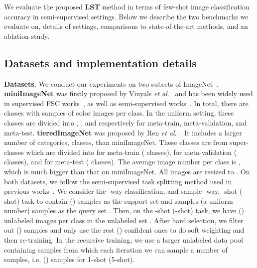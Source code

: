 \documentclass{article}
\newcommand{\myparagraph}[1]{\vspace{0.1em}\noindent\textbf{#1}}
\begin{document}
\label{expriments}


We evaluate the proposed \textbf{LST} method in terms of few-shot image classification accuracy in semi-supervised settings.
Below we describe the two benchmarks we evaluate on, details of settings, comparisons to state-of-the-art methods, and an ablation study.


\subsection{Datasets and implementation details}
\label{sec_dataset_settings}

\myparagraph{Datasets.} We conduct our experiments on two subsets of ImageNet~\cite{Russakovsky2015}.
\textbf{miniImageNet} was firstly proposed by Vinyals \emph{et al}.~\cite{VinyalsBLKW16} and has been widely used in supervised FSC works~\cite{FinnAL17, RaviICLR2017, SunCVPR2019, RusuICLR2019, GrantICLR2018, FranceschiICML18}, as well as semi-supervised works~\cite{LiuICLR2019transductive, RenICLR2018_semisupervised}. 
In total, there are  classes with  samples of  color images per class. 
In the uniform setting, these classes are divided into , , and  respectively for meta-train, meta-validation, and meta-test.
\textbf{tieredImageNet} was proposed by Ren \emph{et al}.~\cite{RenICLR2018_semisupervised}. 
It includes a larger number of categories,   classes, than miniImageNet.
These classes are from  super-classes which are divided into  for meta-train ( classes),  for meta-validation ( classes), 
and  for meta-test ( classes).
The average image number per class is , which is much bigger than that on miniImageNet. 
All images are resized to . On both datasets, we follow the semi-supervised task splitting method used in previous works~\cite{RenICLR2018_semisupervised, LiuICLR2019transductive}.
We consider the -way classification, and sample -way, -shot (-shot) task to contain  () samples as the support set  and  samples (a uniform number) samples as the query set . 
Then, on the -shot (-shot) task, we have  () unlabeled images per class in the unlabeled set .
After hard selection, we filter out  () samples and only use the rest  () confident ones to do soft weighting and then re-training.
In the recursive training, we use a larger unlabeled data pool containing  samples from which each iteration we can sample a number of samples, i.e.  () samples for 1-shot (5-shot).
\end{document}
